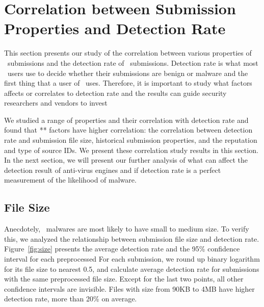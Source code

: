 \section{Correlation between Submission Properties and Detection Rate}
\label{sec:corr}
This section presents our study of the correlation between various properties of \pe\ submissions and the detection rate of \pe\ submissions.
Detection rate is what most \vt\ users use to decide whether their submissions are benign or malware 
and the first thing that a user of \vt\ uses.
Therefore, it is important to study what factors affects or correlates to detection rate
and the results can guide security researchers and vendors to invest 

We studied a range of properties and their correlation with detection rate
and found that ** factors have higher correlation:
the correlation between detection rate and submission file size,
historical submission properties, and the reputation and type of source IDs.
We present these correlation study results in this section.
In the next section, we will present our further analysis of what can affect the detection result of anti-virus engines
and if detection rate is a perfect measurement of the likelihood of malware.



\subsection{File Size}
\label{sec:size}
Anecdotely, \pe\ malwares are most likely to have small to medium size. 
To verify this, we analyzed the relationship between submission file size and detection rate. 
Figure~\ref{fig:size} presents the average detection rate and 
the 95\% confidence interval for each preprocessed 
For each submission, we round up binary logarithm for its file size to nearest 0.5,
and calculate average detection rate for submissions with the same preprocessed file size.
Except for the last two points, all other confidence intervals are invisible.   
Files with size from 90KB to 4MB have higher detection rate, more than 20\% on average. 

